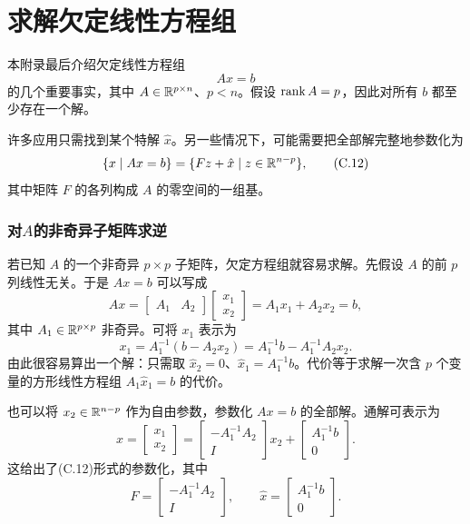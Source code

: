 \section{求解欠定线性方程组}
本附录最后介绍欠定线性方程组
\begin{equation}
 Ax=b\tag{C.11}
\end{equation}
的几个重要事实，其中 $A\in\mathbb R^{p\times n}$、$p<n$。假设 $\operatorname{rank} A=p$，因此对所有 $b$ 都至少存在一个解。

许多应用只需找到某个特解 $\hat x$。另一些情况下，可能需要把全部解完整地参数化为
\begin{equation}
 \{x\mid Ax=b\}=\{Fz+\hat x\mid z\in\mathbb R^{n-p}\},\tag{C.12}
\end{equation}
其中矩阵 $F$ 的各列构成 $A$ 的零空间的一组基。

\subsubsection*{对$A$的非奇异子矩阵求逆}
若已知 $A$ 的一个非奇异 $p\times p$ 子矩阵，欠定方程组就容易求解。先假设 $A$ 的前 $p$ 列线性无关。于是 $Ax=b$ 可以写成
\[
 Ax=\begin{bmatrix}A_1&A_2\end{bmatrix}
 \begin{bmatrix}x_1\\x_2\end{bmatrix}=A_1x_1+A_2x_2=b,
\]
其中 $A_1\in\mathbb R^{p\times p}$ 非奇异。可将 $x_1$ 表示为
\[
 x_1=A_1^{-1}(b-A_2x_2)=A_1^{-1}b-A_1^{-1}A_2x_2.
\]
由此很容易算出一个解：只需取 $\hat x_2=0$、$\hat x_1=A_1^{-1}b$。代价等于求解一次含 $p$ 个变量的方形线性方程组 $A_1\hat x_1=b$ 的代价。

也可以将 $x_2\in\mathbb R^{n-p}$ 作为自由参数，参数化 $Ax=b$ 的全部解。通解可表示为
\[
 x=\begin{bmatrix}x_1\\x_2\end{bmatrix}
 =\begin{bmatrix}-A_1^{-1}A_2\\I\end{bmatrix}x_2
 +\begin{bmatrix}A_1^{-1}b\\0\end{bmatrix}.
\]
这给出了(C.12)形式的参数化，其中
\[
 F=\begin{bmatrix}-A_1^{-1}A_2\\I\end{bmatrix},\qquad
 \hat x=\begin{bmatrix}A_1^{-1}b\\0\end{bmatrix}.
\]

